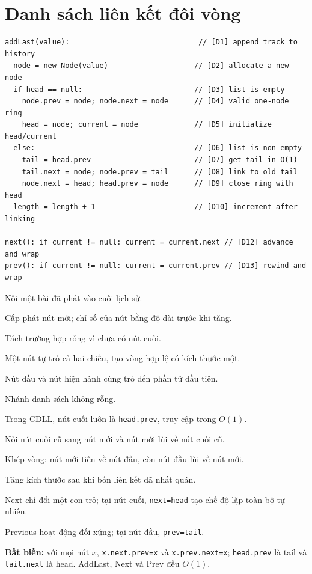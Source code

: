 \documentclass[12pt,a4paper,twoside,openright]{report}
\newcommand{\code}[1]{\texttt{#1}}
\begin{document}
\section{Danh sách liên kết đôi vòng}
\begin{lstlisting}[style=algorithm]
addLast(value):                              // [D1] append track to history
  node = new Node(value)                    // [D2] allocate a new node
  if head == null:                          // [D3] list is empty
    node.prev = node; node.next = node      // [D4] valid one-node ring
    head = node; current = node             // [D5] initialize head/current
  else:                                     // [D6] list is non-empty
    tail = head.prev                        // [D7] get tail in O(1)
    tail.next = node; node.prev = tail      // [D8] link to old tail
    node.next = head; head.prev = node      // [D9] close ring with head
  length = length + 1                       // [D10] increment after linking

next(): if current != null: current = current.next // [D12] advance and wrap
prev(): if current != null: current = current.prev // [D13] rewind and wrap
\end{lstlisting}
\begin{description}[leftmargin=1.2cm,labelwidth=0.8cm,style=multiline,
  font=\ttfamily\bfseries,itemsep=2pt]
  \item[D1] Nối một bài đã phát vào cuối lịch sử.
  \item[D2] Cấp phát nút mới; chỉ số của nút bằng độ dài trước khi tăng.
  \item[D3] Tách trường hợp rỗng vì chưa có nút cuối.
  \item[D4] Một nút tự trỏ cả hai chiều, tạo vòng hợp lệ có kích thước một.
  \item[D5] Nút đầu và nút hiện hành cùng trỏ đến phần tử đầu tiên.
  \item[D6] Nhánh danh sách không rỗng.
  \item[D7] Trong CDLL, nút cuối luôn là \code{head.prev}, truy cập trong $O(1)$.
  \item[D8] Nối nút cuối cũ sang nút mới và nút mới lùi về nút cuối cũ.
  \item[D9] Khép vòng: nút mới tiến về nút đầu, còn nút đầu lùi về nút mới.
  \item[D10] Tăng kích thước sau khi bốn liên kết đã nhất quán.
  \item[D12] Next chỉ đổi một con trỏ; tại nút cuối, \code{next=head} tạo chế độ lặp toàn bộ tự nhiên.
  \item[D13] Previous hoạt động đối xứng; tại nút đầu, \code{prev=tail}.
\end{description}
\textbf{Bất biến:} với mọi nút $x$,
\code{x.next.prev=x} và \code{x.prev.next=x}; \code{head.prev} là tail và
\code{tail.next} là head. AddLast, Next và Prev đều $O(1)$.
\end{document}
